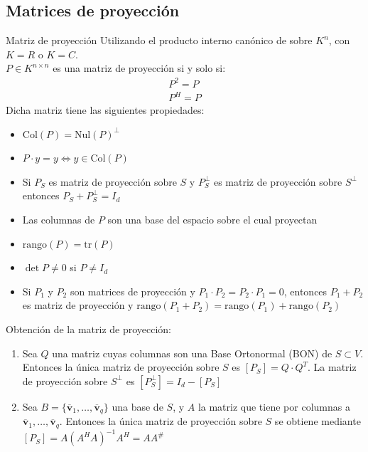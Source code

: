 \documentclass[a4paper, twoside]{article}
\numberwithin{equation}{section}
\numberwithin{figure}{section}
\numberwithin{table}{section}
\newcommand{\vect}[1]{\overline{\textbf{#1}}}
\newcommand{\col}[1]{\text{Col}(#1)}
\newcommand{\nul}[1]{\text{Nul}(#1)}
\newcommand{\rg}[1]{\text{rango}\left(#1\right)}
\newcommand{\tr}[1]{\text{tr}(#1)}
\begin{document}
\subsection{Matrices de proyección}
\begin{definicion*}{Matriz de proyección}
	Utilizando el producto interno canónico de sobre $K^n$, con $K=R$ o $K=C$.\\
	
	$P \in K^{n \times n}$ es una matriz de proyección si y solo si:
	\begin{align}
		P^2=P \\
		P^H=P
	\end{align}
	Dicha matriz tiene las siguientes propiedades:
	\begin{itemize}
		\item $\col{P} = \nul{P}^\bot$
		\item $P \cdot y = y \Longleftrightarrow y \in \col{P}$
		\item Si $P_S$ es matriz de proyección sobre $S$ y $P_S^\bot$ es matriz de proyección sobre $S^\bot$ entonces $P_S+P_S^\bot=I_d$
		\item Las columnas de $P$ son una base del espacio sobre el cual proyectan
		\item $\rg{P}=\tr{P}$
		\item $\det{P} \neq 0$ si $P\neq I_d$
		\item Si $P_1$ y $P_2$ son matrices de proyección y $P_1 \cdot P_2 = P_2 \cdot P_1=0$, entonces $P_1 + P_2$ es matriz de proyección y $\rg{P_1+P_2} = \rg{P_1}+\rg{P_2}$
	\end{itemize}
	Obtención de la matriz de proyección:
	\begin{enumerate}
		\item Sea $Q$ una matriz cuyas columnas son una Base Ortonormal (BON) de $S \subset V$. Entonces la única matriz de proyección sobre $S$ es $[P_S] = Q \cdot Q^T$. La matriz de proyección sobre $S^\bot$ es $[P_S^\bot] = I_d-[P_S]$
		\item Sea $B = \{\vect{v}_1, \ldots, \vect{v}_q \}$ una base de $S$, y $A$ la matriz que tiene por columnas a $\vect{v}_1, \ldots, \vect{v}_q$. Entonces la única matriz de proyección sobre $S$ se obtiene mediante $[P_S] = A \left( A^H A \right)^{-1} A^H = A A^{\#}$
	\end{enumerate}
\end{definicion*}
\end{document}
